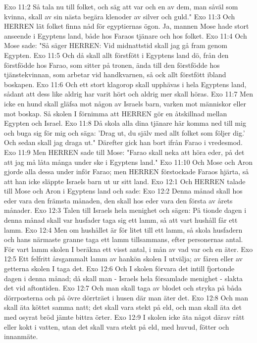 Exo 11:2  Så tala nu till folket, och säg att var och en av dem, man såväl som kvinna, skall av sin nästa begära klenoder av silver och guld."
Exo 11:3  Och HERREN lät folket finna nåd för egyptiernas ögon. Ja, mannen Mose hade stort anseende i Egyptens land, både hos Faraos tjänare och hos folket.
Exo 11:4  Och Mose sade: "Så säger HERREN: Vid midnattstid skall jag gå fram genom Egypten.
Exo 11:5  Och då skall allt förstfött i Egyptens land dö, från den förstfödde hos Farao, som sitter på tronen, ända till den förstfödde hos tjänstekvinnan, som arbetar vid handkvarnen, så ock allt förstfött ibland boskapen.
Exo 11:6  Och ett stort klagorop skall upphävas i hela Egyptens land, sådant att dess like aldrig har varit hört och aldrig mer skall höras.
Exo 11:7  Men icke en hund skall gläfsa mot någon av Israels barn, varken mot människor eller mot boskap. Så skolen I förnimma att HERREN gör en åtskillnad mellan Egypten och Israel.
Exo 11:8  Då skola alla dina tjänare här komma ned till mig och buga sig för mig och säga: 'Drag ut, du själv med allt folket som följer dig.' Och sedan skall jag draga ut." Därefter gick han bort ifrån Farao i vredesmod.
Exo 11:9  Men HERREN sade till Mose: "Farao skall neka att höra eder, på det att jag må låta många under ske i Egyptens land."
Exo 11:10  Och Mose och Aron gjorde alla dessa under inför Farao; men HERREN förstockade Faraos hjärta, så att han icke släppte Israels barn ut ur sitt land.
Exo 12:1  Och HERREN talade till Mose och Aron i Egyptens land och sade:
Exo 12:2  Denna månad skall hos eder vara den främsta månaden, den skall hos eder vara den första av årets månader.
Exo 12:3  Talen till Israels hela menighet och sägen: På tionde dagen i denna månad skall var husfader taga sig ett lamm, så att vart hushåll får ett lamm.
Exo 12:4  Men om hushållet är för litet till ett lamm, så skola husfadern och hans närmaste granne taga ett lamm tillsammans, efter personernas antal. För vart lamm skolen I beräkna ett visst antal, i mån av vad var och en äter.
Exo 12:5  Ett felfritt årsgammalt lamm av hankön skolen I utvälja; av fåren eller av getterna skolen I taga det.
Exo 12:6  Och I skolen förvara det intill fjortonde dagen i denna månad; då skall man - Israels hela församlade menighet - slakta det vid aftontiden.
Exo 12:7  Och man skall taga av blodet och stryka på båda dörrposterna och på övre dörrträet i husen där man äter det.
Exo 12:8  Och man skall äta köttet samma natt; det skall vara stekt på eld, och man skall äta det med osyrat bröd jämte bittra örter.
Exo 12:9  I skolen icke äta något därav rått eller kokt i vatten, utan det skall vara stekt på eld, med huvud, fötter och innanmäte.
